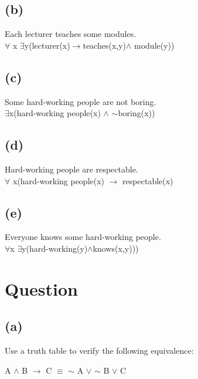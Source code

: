 \documentclass[12pt,a4paper]{article}
\begin{document}
{		\subsection{(b)}
		Each lecturer teaches some modules.	\\
		$\forall$ x $\exists$y(lecturer(x)$\rightarrow$teaches(x,y)$\wedge$ module(y))
		
		
		
		
		
		\subsection{(c)}
		Some hard-working people are not boring.\\
		$\exists$x(hard-working people(x) $\wedge$ $\mathord{\sim}$boring(x))
		
		
		
		
		
		\subsection{(d)}
		Hard-working people are respectable.\\
		
		
		
		$\forall$ x(hard-working people(x) $\rightarrow$ respectable(x)\\
	
		
		
		
		\subsection{(e)}
		Everyone knows some hard-working people.\\
	    $\forall$x 	$\exists$y(hard-working(y)$\wedge$knows(x,y)))
		
		
		
	\section{Question}
		\subsection{(a)}
	
		Use a truth table to verify the following equivalence:
		
		
			A $\wedge$ B $\rightarrow$ C $\equiv$ $\mathord{\sim}$ A $\lor$ $\mathord{\sim}$ B $\lor$ C
		
	
				
}
\end{document}

